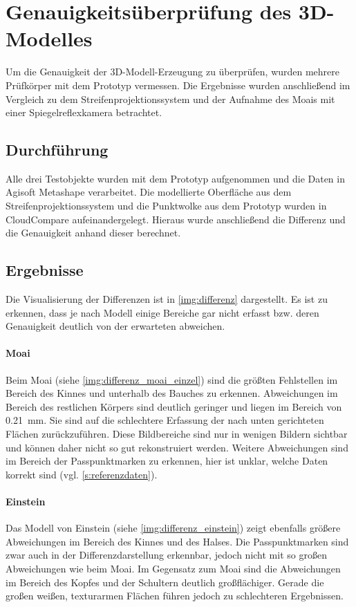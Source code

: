 \documentclass[./00PhotoBox.tex]{subfiles}
\begin{document}
\section{Genauigkeitsüberprüfung des 3D-Modelles}
\label{s:genauigkeitsueberpruefung}
Um die Genauigkeit der 3D-Modell-Erzeugung zu überprüfen, wurden mehrere Prüf\-körper mit dem Prototyp vermessen. Die Ergebnisse wurden anschließend im Vergleich zu dem Streifenprojektionssystem und der Aufnahme des Moais mit einer Spiegelreflexkamera betrachtet.

\subsection{Durchführung}
Alle drei Testobjekte wurden mit dem Prototyp aufgenommen und die Daten in Agisoft Metashape verarbeitet. Die modellierte Oberfläche aus dem Streifenprojektionssystem und die Punktwolke aus dem Prototyp wurden in CloudCompare aufeinandergelegt. Hieraus wurde anschließend die Differenz und die Genauigkeit anhand dieser berechnet.

\subsection{Ergebnisse}
Die Visualisierung der Differenzen ist in \autoref{img:differenz} dargestellt. Es ist zu erkennen, dass je nach Modell einige Bereiche gar nicht erfasst bzw. deren Genauigkeit deutlich von der erwarteten abweichen.

\paragraph{Moai}
Beim Moai (siehe \autoref{img:differenz_moai_einzel}) sind die größten Fehlstellen im Bereich des Kinnes und unterhalb des Bauches zu erkennen. Abweichungen im Bereich des restlichen Körpers sind deutlich geringer und liegen im Bereich von \SI{0,21}{\milli\metre}. Sie sind auf die schlechtere Erfassung der nach unten gerichteten Flächen zurückzuführen. Diese Bildbereiche sind nur in wenigen Bildern sichtbar und können daher nicht so gut rekonstruiert werden. Weitere Abweichungen sind im Bereich der Passpunktmarken zu erkennen, hier ist unklar, welche Daten korrekt sind (vgl. \autoref{s:referenzdaten}).


\paragraph{Einstein}
Das Modell von Einstein (siehe \autoref{img:differenz_einstein}) zeigt ebenfalls größere Abweichungen im Bereich des Kinnes und des Halses. Die Passpunktmarken sind zwar auch in der Differenzdarstellung erkennbar, jedoch nicht mit so großen Abweichungen wie beim Moai. Im Gegensatz zum Moai sind die Abweichungen im Bereich des Kopfes und der Schultern deutlich großflächiger. Gerade die großen weißen, texturarmen Flächen führen jedoch zu schlechteren Ergebnissen.
\end{document}
